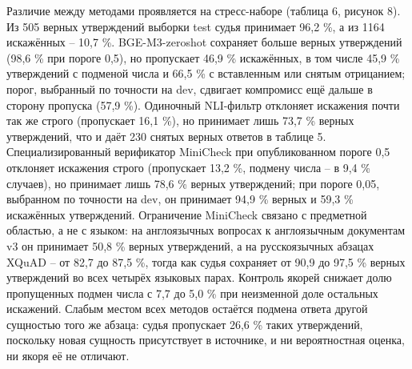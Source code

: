 \documentclass[14pt,a4paper]{extarticle}
\begin{document}
Различие между методами проявляется на стресс-наборе (таблица 6, рисунок 8). Из 505 верных утверждений выборки test судья принимает 96,2 \%, а из 1164 искажённых – 10,7 \%. BGE-M3-zeroshot сохраняет больше верных утверждений (98,6 \% при пороге 0,5), но пропускает 46,9 \% искажённых, в том числе 45,9 \% утверждений с подменой числа и 66,5 \% с вставленным или снятым отрицанием; порог, выбранный по точности на dev, сдвигает компромисс ещё дальше в сторону пропуска (57,9 \%). Одиночный NLI-фильтр отклоняет искажения почти так же строго (пропускает 16,1 \%), но принимает лишь 73,7 \% верных утверждений, что и даёт 230 снятых верных ответов в таблице 5. Специализированный верификатор MiniCheck при опубликованном пороге 0,5 отклоняет искажения строго (пропускает 13,2 \%, подмену числа – в 9,4 \% случаев), но принимает лишь 78,6 \% верных утверждений; при пороге 0,05, выбранном по точности на dev, он принимает 94,9 \% верных и 59,3 \% искажённых утверждений. Ограничение MiniCheck связано с предметной областью, а не с языком: на англоязычных вопросах к англоязычным документам v3 он принимает 50,8 \% верных утверждений, а на русскоязычных абзацах XQuAD – от 82,7 до 87,5 \%, тогда как судья сохраняет от 90,9 до 97,5 \% верных утверждений во всех четырёх языковых парах. Контроль якорей снижает долю пропущенных подмен числа с 7,7 до 5,0 \% при неизменной доле остальных искажений. Слабым местом всех методов остаётся подмена ответа другой сущностью того же абзаца: судья пропускает 26,6 \% таких утверждений, поскольку новая сущность присутствует в источнике, и ни вероятностная оценка, ни якоря её не отличают.
\end{document}
